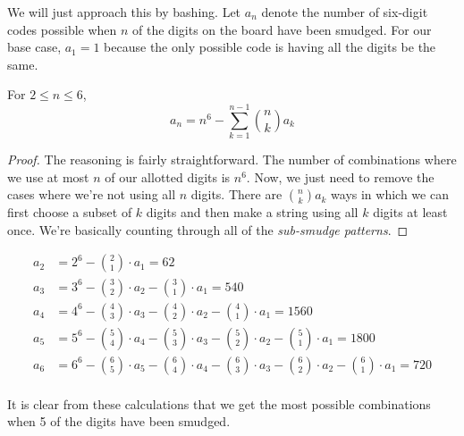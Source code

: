 \documentclass[10pt]{../usamts}
\begin{document}

\begin{solution}
We will just approach this by bashing. Let $a_n$ denote the number of six-digit codes possible when $n$ of the digits on the board have been smudged.
For our base case, $a_1 = 1$ because the only possible code is having all the digits be the same.

\begin{claim}
    For $2 \le n \le 6$,
    $$a_n = n^6 - \sum_{k=1}^{n-1} \binom{n}{k} a_k$$
\end{claim}
\begin{proof}
    The reasoning is fairly straightforward. The number of combinations where we use at most $n$ of our allotted digits is $n^6$. Now, we just need to remove the cases where we're not using all $n$ digits. There are $\binom{n}{k} a_k$ ways in which we can first choose a subset of $k$ digits and then make a string using all $k$ digits at least once. We're basically counting through all of the \textit{sub-smudge patterns}.
\end{proof}
\begin{align*}
a_2 &= 2^6 - \binom{2}{1} \cdot a_1 = 62\\
a_3 &= 3^6 - \binom{3}{2} \cdot a_2 - \binom{3}{1} \cdot a_1 = 540\\
a_4 &= 4^6 - \binom{4}{3} \cdot a_3 - \binom{4}{2} \cdot a_2 - \binom{4}{1} \cdot a_1 = 1560\\
a_5 &= 5^6 - \binom{5}{4} \cdot a_4 - \binom{5}{3} \cdot a_3 - \binom{5}{2} \cdot a_2 - \binom{5}{1} \cdot a_1 = 1800\\
a_6 &= 6^6 - \binom{6}{5} \cdot a_5 - \binom{6}{4} \cdot a_4 - \binom{6}{3} \cdot a_3 - \binom{6}{2} \cdot a_2 - \binom{6}{1} \cdot a_1 = 720\\
\end{align*}

It is clear from these calculations that we get the most possible combinations when 5 of the digits have been smudged.

\end{solution}
\end{document}
